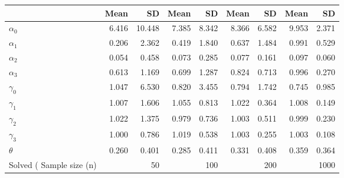
\begin{tabular}[t]{lrrrrrrrr}
\toprule
  & Mean & SD & Mean  & SD  & Mean   & SD   & Mean    & SD   \\
\midrule
$\alpha_{0}$ & 6.416 & 10.448 & 7.385 & 8.342 & 8.366 & 6.582 & 9.953 & 2.371\\
$\alpha_{1}$ & 0.206 & 2.362 & 0.419 & 1.840 & 0.637 & 1.484 & 0.991 & 0.529\\
$\alpha_{2}$ & 0.054 & 0.458 & 0.073 & 0.285 & 0.077 & 0.161 & 0.097 & 0.060\\
$\alpha_{3}$ & 0.613 & 1.169 & 0.699 & 1.287 & 0.824 & 0.713 & 0.996 & 0.270\\
$\gamma_{0}$ & 1.047 & 6.530 & 0.820 & 3.455 & 0.794 & 1.742 & 0.745 & 0.985\\
$\gamma_{1}$ & 1.007 & 1.606 & 1.055 & 0.813 & 1.022 & 0.364 & 1.008 & 0.149\\
$\gamma_{2}$ & 1.022 & 1.375 & 0.979 & 0.736 & 1.003 & 0.511 & 0.999 & 0.230\\
$\gamma_{3}$ & 1.000 & 0.786 & 1.019 & 0.538 & 1.003 & 0.255 & 1.003 & 0.108\\
$\theta$ & 0.260 & 0.401 & 0.285 & 0.411 & 0.331 & 0.408 & 0.359 & 0.364\\
Solved (%
Sample size (n) &  & 50 &  & 100 &  & 200 &  & 1000\\
\bottomrule
\end{tabular}
